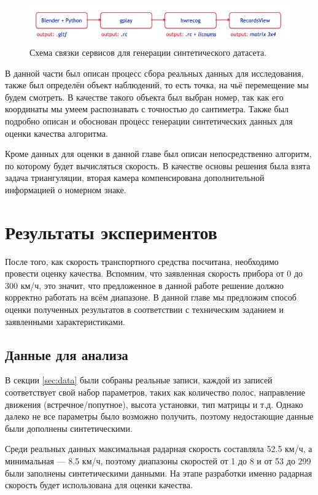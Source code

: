 \documentclass[specification,annotation,times]{itmo-student-thesis}
\begin{document}
\begin{figure}[!ht]
	\caption{Схема связки сервисов для генерации синтетического датасета.}\label{img:progs}
	\includegraphics[width=0.85\linewidth]{../png/programs.png}
	\centering
\end{figure}

\chapterconclusion
В данной части был описан процесс сбора реальных данных для исследования, также был определён объект наблюдений, то есть точка, на чьё перемещение мы будем смотреть. В качестве такого объекта был выбран номер, так как его координаты мы умеем распознавать с точностью до сантиметра. Также был подробно описан и обоснован процесс генерации синтетических данных для оценки качества алгоритма.

Кроме данных для оценки в данной главе был описан непосредственно алгоритм, по которому будет вычисляться скорость. В качестве основы решения была взята задача триангуляции, вторая камера компенсирована дополнительной информацией о номерном знаке.


\chapter{Результаты экспериментов}
После того, как скорость транспортного средства посчитана, необходимо провести оценку качества. Вспомним, что заявленная скорость прибора от 0 до 300 км/ч, это значит, что предложенное в данной работе решение должно корректно работать на всём диапазоне. В данной главе мы предложим способ оценки полученных результатов в соответствии с техническим заданием и заявленными характеристиками.

\section{Данные для анализа}
В секции \ref{sec:data} были собраны реальные записи, каждой из записей соответствует свой набор параметров, таких как количество полос, направление движения (встречное/попутное), высота установки, тип матрицы и т.д. Однако далеко не все параметры было возможно получить, поэтому недостающие данные были дополнены синтетическими.

Среди реальных данных максимальная радарная скорость составляла 52.5 км/ч, а минимальная --- 8.5 км/ч, поэтому диапазоны скоростей от 1 до 8 и от 53 до 299 были заполнены синтетическими данными. На этапе разработки именно радарная скорость будет использована для оценки качества.
\end{document}
